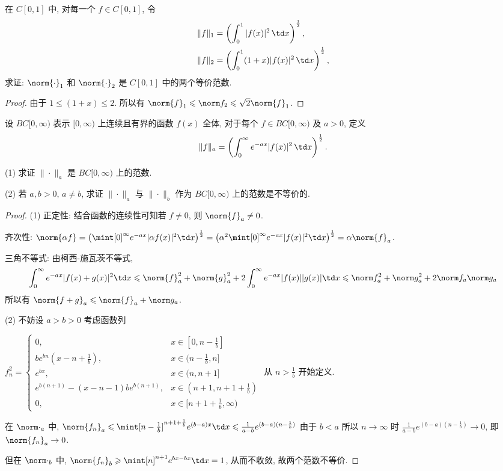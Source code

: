 \problem[1.4.4]在 $C[0,1]$ 中, 对每一个 $f \in C[0,1]$, 令
\begin{align*}
	\|f\|_1 &= \left( \int_0^1 |f(x)|^2 \, \td x \right)^{\frac{1}{2}}, \\
	\|f\|_2 &= \left( \int_0^1 (1+x) |f(x)|^2 \, \td x \right)^{\frac{1}{2}},
\end{align*}
求证: $\norm{\cdot}_1$ 和 $\norm{\cdot}_2$ 是 $C[0,1]$ 中的两个等价范数.

\begin{proof}
	由于 $1\leqslant (1+x)\leqslant 2$. 所以有
	$\norm{f}_1\leqslant\norm f_2\leqslant\sqrt{2}\norm{f}_1$.
\end{proof}

\problem[1.4.5] 设 $BC[0,\infty)$ 表示 $[0,\infty)$ 上连续且有界的函数 $f(x)$ 全体, 对于每个 $f \in BC[0,\infty)$ 及 $a > 0$, 定义
\[
\|f\|_a = \left( \int_0^\infty e^{-ax} |f(x)|^2 \, \td x \right)^{\frac{1}{2}}.
\]

(1) 求证 $\|\cdot\|_a$ 是 $BC[0,\infty)$ 上的范数.

(2) 若 $a, b > 0$, $a \neq b$, 求证 $\|\cdot\|_a$ 与 $\|\cdot\|_b$ 作为 $BC[0,\infty)$ 上的范数是不等价的.

\begin{proof}
	(1) 正定性: 结合函数的连续性可知若 $f\neq 0$, 则 $\norm{f}_a\neq 0$.

	齐次性: $\norm{\alpha f}=\left(\mint[0]^\infty e^{-ax}|\alpha f(x)|^2\td x\right)^{\frac12}=\left(\alpha^2\mint[0]^\infty e^{-ax}|f(x)|^2\td x\right)^{\frac12}=\alpha\norm{f}_a$.

	三角不等式: 由柯西-施瓦茨不等式, $$\int_0^\infty e^{-ax}|f(x)+g(x)|^2\td x\leqslant \norm{f}_a^2+\norm{g}_a^2+2\int_0^\infty e^{-ax}|f(x)||g(x)|\td x\leqslant\norm f_a^2+\norm g_a^2+2\norm f_a\norm g_a$$ 所以有 $\norm{f+g}_a\leqslant \norm{f}_a+\norm g_a$.

	(2) 不妨设 $a>b>0$ 考虑函数列

	$f_n^2=\left\lbrace\begin{array}{ll}
		0, & x\in [0,n-\frac1b]\\
		be^{bn}(x-n+\frac1b), & x\in(n-\frac1b,n]\\
		e^{bx}, & x\in (n,n+1]\\
		e^{b(n+1)}-(x-n-1)be^{b(n+1)}, & x\in (n+1,n+1+\frac 1b)\\
		0, & x\in [n+1+\frac 1b,\infty)
	\end{array}\right.$ 从 $n>\frac1b$ 开始定义.

	在 $\norm\cdot_a$ 中, $\norm{f_n}_a\leqslant \mint[n-\frac 1b]^{n+1+\frac1b}e^{(b-a)x}\td x\leqslant \frac{1}{a-b}e^{(b-a)(n-\frac1b)}$ 由于 $b<a$ 所以 $n\to\infty$ 时 $\frac{1}{a-b}e^{(b-a)(n-\frac{1}{b})}\to 0$, 即 $\norm{f_n}_a\to 0$.

	但在 $\norm\cdot_b$ 中, $\norm{f_n}_b\geqslant \mint[n]^{n+1}e^{bx-bx}\td x=1$, 从而不收敛, 故两个范数不等价.
\end{proof}

